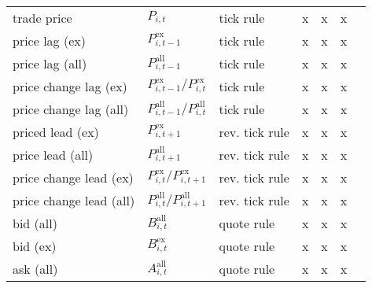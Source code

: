 \begin{ThreePartTable}
\begin{longtable}{@{}lllllll@{}}
            trade price             & $P_{i, t}$                                                                                       & tick rule            & x & x & x        \\
            price lag (ex)          & $P_{i, t-1}^{\text{ex}}$\tnote{*}                                                                & tick rule            & x & x & x         \\
            price lag (all)         & $P_{i, t-1}^{\text{all}}$\tnote{*}                                                               & tick rule            & x & x & x          \\
            price change lag (ex)   & $P_{i, t-1}^{\text{ex}}/P_{i, t}^{\text{ex}}$\tnote{*}                                           & tick rule            & x & x & x         \\
            price change lag (all)  & $P_{i, t-1}^{\text{all}}/P_{i, t}^{\text{all}}$\tnote{*}                                         & tick rule            & x & x & x         \\
            priced lead (ex)        & $P_{i, t+1}^{\text{ex}}$\tnote{*}                                                                & rev. tick rule       & x & x & x          \\
            price lead (all)        & $P_{i, t+1}^{\text{all}}$\tnote{*}                                                               & rev. tick rule       & x & x & x          \\
            price change lead (ex)  & $P_{i, t}^{\text{ex}}/P_{i, t+1}^{\text{ex}}$\tnote{*}                                           & rev. tick rule       & x & x & x          \\
            price change lead (all) & $P_{i, t}^{\text{all}}/P_{i, t+1}^{\text{all}}$\tnote{*}                                         & rev. tick rule       & x & x & x          \\
            bid (all)               & $B_{i, t}^{\text{all}}$                                                                          & quote rule           & x & x & x          \\
            bid (ex)                & $B_{i, t}^{\text{ex}}$                                                                           & quote rule           & x & x & x          \\
            ask (all)               & $A_{i, t}^{\text{all}}$                                                                          & quote rule           & x & x & x          \\

\end{longtable}
\end{ThreePartTable}
